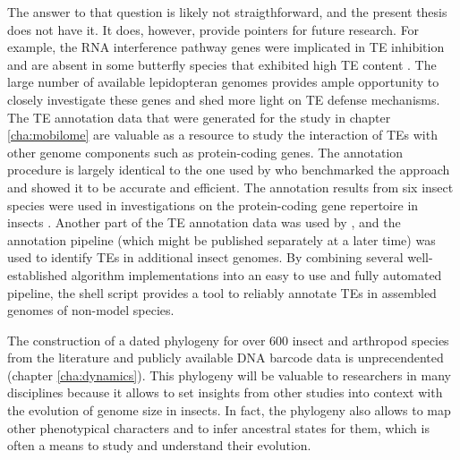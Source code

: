 The answer to that question is likely not straigthforward, and the
present thesis does not have it. It does, however, provide pointers for
future research. For example, the RNA interference pathway genes were
implicated in TE inhibition \citep{Aravin2001,Czech2008} and are absent
in some butterfly species that exhibited high TE content
\citep{Dowling2017}.  The large number of available lepidopteran genomes
provides ample opportunity to closely investigate these genes and shed
more light on TE defense mechanisms.  The TE annotation data that were
generated for the study in chapter \ref{cha:mobilome} are valuable as a
resource to study the interaction of TEs with other genome components
such as protein-coding genes. The annotation procedure is largely
identical to the one used by \citet{Reinar2016} who benchmarked the
approach and showed it to be accurate and efficient. The annotation
results from six insect species  were
used in investigations on the protein-coding gene repertoire in insects
. Another part of the TE annotation data was
used by \citep{Provataris2018}, and the annotation pipeline (which might
be published separately at a later time) was used to identify TEs in
additional insect genomes. By combining several well-established
algorithm implementations into an easy to use and fully automated
pipeline, the shell script provides a tool to reliably annotate TEs in
assembled genomes of non-model species. 

The construction of a dated phylogeny for over 600 insect and arthropod
species from the literature and publicly available DNA barcode data is
unprecendented (chapter \ref{cha:dynamics}). This phylogeny will be
valuable to researchers in many disciplines because it allows to set
insights from other studies into context with the evolution of genome
size in insects.  In fact, the phylogeny also allows to map other
phenotypical characters and to infer ancestral states for them, which is
often a means to study and understand their evolution.

